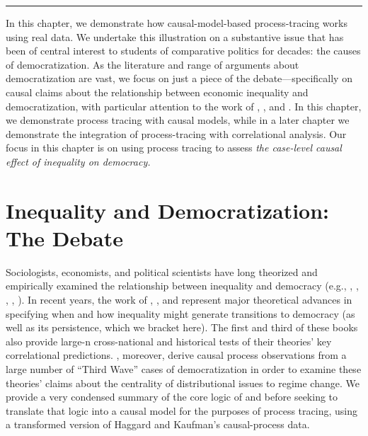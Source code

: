 \documentclass[
  12pt,
]{book}
\begin{document}
\begin{center}\rule{0.5\linewidth}{0.5pt}\end{center}

In this chapter, we demonstrate how causal-model-based process-tracing works using real data. We undertake this illustration on a substantive issue that has been of central interest to students of comparative politics for decades: the causes of democratization. As the literature and range of arguments about democratization are vast, we focus on just a piece of the debate---specifically on causal claims about the relationship between economic inequality and democratization, with particular attention to the work of \citet{boix2003democracy}, \citet{acemoglu2005economic}, and \citet{haggard2012inequality}. In this chapter, we demonstrate process tracing with causal models, while in a later chapter we demonstrate the integration of process-tracing with correlational analysis. Our focus in this chapter is on using process tracing to assess \emph{the case-level causal effect of inequality on democracy.}

\hypertarget{inequality-and-democratization-the-debate}{%
\section{Inequality and Democratization: The Debate}\label{inequality-and-democratization-the-debate}}

Sociologists, economists, and political scientists have long theorized and empirically examined the relationship between inequality and democracy (e.g., \citet{dahl1973polyarchy}, \citet{bollen1985political}, \citet{acemoglu2005economic}, \citet{boix2003democracy}, \citet{ansell2014inequality}). In recent years, the work of \citet{boix2003democracy}, \citet{acemoglu2005economic}, and \citet{ansell2014inequality} represent major theoretical advances in specifying when and how inequality might generate transitions to democracy (as well as its persistence, which we bracket here). The first and third of these books also provide large-n cross-national and historical tests of their theories' key correlational predictions. \citet{haggard2012inequality}, moreover, derive causal process observations from a large number of ``Third Wave'' cases of democratization in order to examine these theories' claims about the centrality of distributional issues to regime change. We provide a very condensed summary of the core logic of \citet{boix2003democracy} and \citet{acemoglu2005economic} before seeking to translate that logic into a causal model for the purposes of process tracing, using a transformed version of Haggard and Kaufman's causal-process data.
\end{document}

